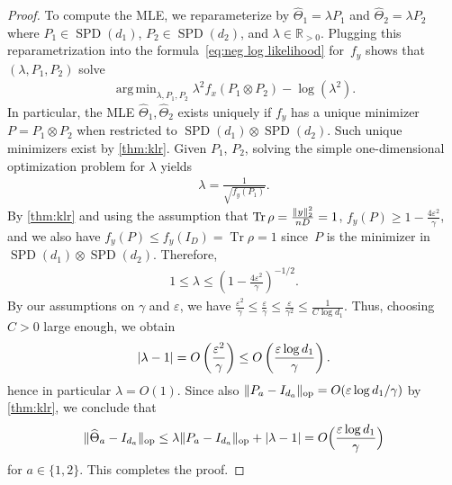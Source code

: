 \documentclass[aos]{imsart}
\theoremstyle{definition}
\numberwithin{equation}{section}
\DeclareMathOperator{\op}{op}
\DeclareMathOperator{\tr}{Tr}
\DeclareMathOperator{\SSPD}{SPD}
\DeclareMathOperator*{\argmin}{arg\,min}
\DeclarePairedDelimiter{\abs}{\lvert}{\rvert}
\DeclarePairedDelimiter{\norm}{\lVert}{\rVert}
\newcommand{\R}{{\mathbb{R}}}
\newcommand{\htheta}{\widehat{\Theta}}
\newcommand{\ot}{\otimes}
\newcommand{\eps}{\varepsilon}
\begin{document}
\begin{proof}
To compute the MLE, we reparameterize by $\htheta_1 = \lambda P_1$ and $\htheta_2 = \lambda P_2$ where $P_1 \in \SSPD(d_1)$, $P_2 \in \SSPD(d_2)$, and $\lambda \in \R_{> 0}$.
Plugging this reparametrization into the formula~\eqref{eq:neg log likelihood} for~$f_y$ shows that $(\lambda, P_1, P_2)$ solve
\begin{align*}
  \argmin_{\lambda, P_1, P_2} \lambda^2 f_x(P_1 \ot P_2) - \log(\lambda^2).
\end{align*}
In particular, the MLE $\htheta_1, \htheta_2$ exists uniquely if $f_y$ has a unique minimizer~$P = P_1 \ot P_2$ when restricted to $\SSPD(d_1) \ot \SSPD(d_2)$.
Such unique minimizers exist by \cref{thm:klr}.
Given $P_1$, $P_2$, solving the simple one-dimensional optimization problem for $\lambda$ yields
\begin{align*}
  \lambda = \frac1{\sqrt{f_y(P_1)}}.
\end{align*}
By \cref{thm:klr} and using the assumption that $\tr\rho=\frac{\norm{y}_2^2}{nD}=1$, $f_y(P) \geq 1 - \frac{4 \eps^2}{\gamma}$, and we also have $f_y(P) \leq f_y(I_D) = \tr\rho = 1$ since~$P$ is the minimizer in $\SSPD(d_1) \ot \SSPD(d_2)$.
Therefore,
\begin{align*}
  1
\leq \lambda
\leq \left( 1 - \frac{4 \eps^2}{\gamma}\right)^{-1/2}.
\end{align*}
By our assumptions on $\gamma$ and $\eps$, we have $\frac{\eps^2}\gamma \leq \frac\eps\gamma \leq \frac\eps{\gamma^2} \leq \frac1{C \log d_1}$.
Thus, choosing $C>0$ large enough, we obtain
\begin{align*}
  \abs{\lambda - 1}
= O\left(\frac{\eps^2}{\gamma}\right)
\leq O\left(\frac{\eps \log d_1}{\gamma}\right).
\end{align*}
hence in particular $\lambda = O(1)$.
Since also $\norm{P_a - I_{d_a}}_{\op} = O(\eps\log d_1/\gamma)$ by \cref{thm:klr}, we conclude that
\begin{align*}
  \norm{\htheta_a - I_{d_a}}_{\op}
\leq \lambda \norm{P_a - I_{d_a}}_{\op} + \abs{\lambda - 1}
= O\Bigl(\frac{\eps \log d_1}\gamma\Bigr)
\end{align*}
for $a\in\{1,2\}$.
This completes the proof.

\end{proof}
\end{document}
